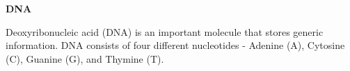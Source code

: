 \question \textbf{DNA}
  
Deoxyribonucleic acid (DNA) is an important molecule that stores generic information. DNA consists of four different nucleotides - Adenine (A), Cytosine (C), Guanine (G), and Thymine (T).

\vspace{0.1 in}

